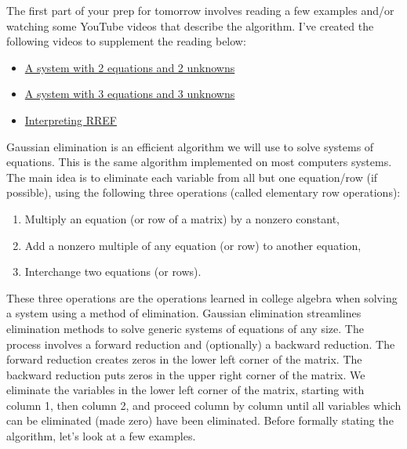 \documentclass[letterpaper,oneside]{book}%
\theoremstyle{plain}
\theoremstyle{box}
\theoremstyle{problem}
\begin{document}
The first part of your prep for tomorrow involves reading a few examples and/or watching some YouTube videos that describe the algorithm. I've created the following videos to supplement the reading below:
\begin{itemize}
 \item \href{http://www.youtube.com/watch?v=Di1Gr1jVMMk&feature=share&list=PL7A2089C33C8EFC84}{A system with 2 equations and 2 unknowns}
 \item \href{http://www.youtube.com/watch?v=9_lAevTRNTg&feature=share&list=PL7A2089C33C8EFC84}{A system with 3 equations and 3 unknowns}
 \item \href{http://www.youtube.com/watch?v=89QO4t1S-cA&feature=share&list=PL7A2089C33C8EFC84}{Interpreting RREF}
\end{itemize}
 

Gaussian elimination is an efficient algorithm we will use to solve systems of equations. This is the same algorithm implemented on most computers systems. The main idea is to eliminate each variable from all but one equation/row (if possible), using the following three operations (called elementary row operations):
\begin{enumerate}
  \item Multiply an equation (or row of a matrix) by a nonzero constant,
  \item Add a nonzero multiple of any equation (or row) to another equation,
  \item Interchange two equations (or rows).
\end{enumerate}
These three operations are the operations learned in college algebra when solving a system using a method of elimination.  Gaussian elimination streamlines elimination methods to solve generic systems of equations of any size. The process involves a forward reduction and (optionally) a backward reduction. The forward reduction creates zeros in the lower left corner of the matrix.  The backward reduction puts zeros in the upper right corner of the matrix. We eliminate the variables in the lower left corner of the matrix, starting with column 1, then column 2, and proceed column by column until all variables which can be eliminated (made zero) have been eliminated. Before formally stating the algorithm, let's look at a few examples. 
\end{document}
